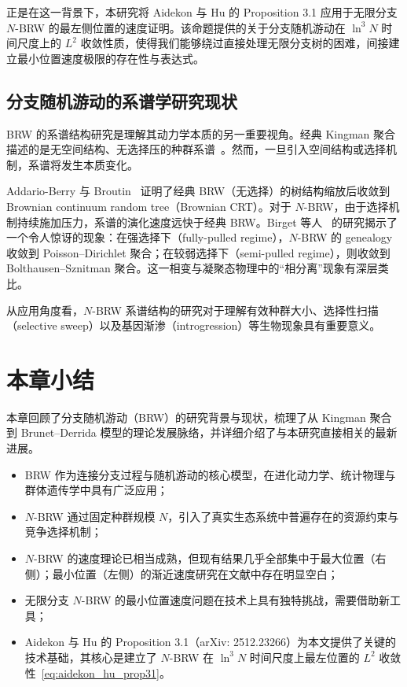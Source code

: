 正是在这一背景下，本研究将 Aidekon 与 Hu 的 Proposition 3.1 应用于无限分支 $N$-BRW 的最左侧位置的速度证明。该命题提供的关于分支随机游动在 $\ln^3 N$ 时间尺度上的 $L^2$ 收敛性质，使得我们能够绕过直接处理无限分支树的困难，间接建立最小位置速度极限的存在性与表达式。

\subsection{分支随机游动的系谱学研究现状}
\label{ssec:genealogy}

BRW 的系谱结构研究是理解其动力学本质的另一重要视角。经典 Kingman 聚合描述的是无空间结构、无选择压的种群系谱~\cite{kingman1982coalescent}。然而，一旦引入空间结构或选择机制，系谱将发生本质变化。

Addario-Berry 与 Broutin~\cite{addario2009} 证明了经典 BRW（无选择）的树结构缩放后收敛到 Brownian continuum random tree（Brownian CRT）。对于 $N$-BRW，由于选择机制持续施加压力，系谱的演化速度远快于经典 BRW。Birget 等人~\cite{birget2023} 的研究揭示了一个令人惊讶的现象：在强选择下（fully-pulled regime），$N$-BRW 的 genealogy 收敛到 Poisson--Dirichlet 聚合；在较弱选择下（semi-pulled regime），则收敛到 Bolthausen--Sznitman 聚合。这一相变与凝聚态物理中的``相分离''现象有深层类比。

从应用角度看，$N$-BRW 系谱结构的研究对于理解有效种群大小、选择性扫描（selective sweep）以及基因渐渗（introgression）等生物现象具有重要意义。

\section{本章小结}
\label{sec:chapter_summary}

本章回顾了分支随机游动（BRW）的研究背景与现状，梳理了从 Kingman 聚合到 Brunet--Derrida 模型的理论发展脉络，并详细介绍了与本研究直接相关的最新进展。

\begin{itemize}
\item BRW 作为连接分支过程与随机游动的核心模型，在进化动力学、统计物理与群体遗传学中具有广泛应用；
\item $N$-BRW 通过固定种群规模 $N$，引入了真实生态系统中普遍存在的资源约束与竞争选择机制；
\item $N$-BRW 的速度理论已相当成熟，但现有结果几乎全部集中于最大位置（右侧）；最小位置（左侧）的渐近速度研究在文献中存在明显空白；
\item 无限分支 $N$-BRW 的最小位置速度问题在技术上具有独特挑战，需要借助新工具；
\item Aidekon 与 Hu 的 Proposition 3.1（arXiv: 2512.23266）为本文提供了关键的技术基础，其核心是建立了 $N$-BRW 在 $\ln^3 N$ 时间尺度上最左位置的 $L^2$ 收敛性~\eqref{eq:aidekon_hu_prop31}。
\end{itemize}

